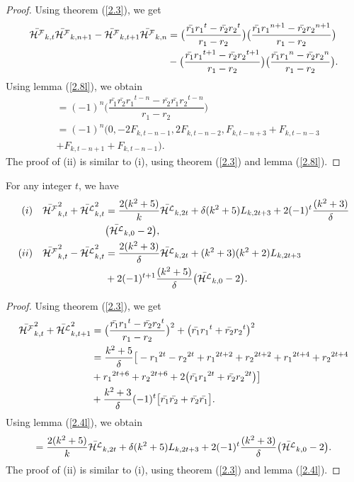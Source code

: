 \begin{proof}
Using theorem (\ref{2.3}), we get
\begin{align*}
\bar{{\mathcal{H^F}}}_{k,t}\bar{{\mathcal{H^F}}}_{k,n+1}-\bar{{\mathcal{H^F}}}_{k,t+1}\bar{{\mathcal{H^F}}}_{k,n}&=\big(\dfrac{\bar{r_1}{{r_1}}^{t}-\bar{r_2}{r_{2}}^{t}}{r_1-r_2}\big)\big(\dfrac{\bar{r_1}{{r_1}}^{n+1}-\bar{r_2}{r_{2}}^{n+1}}{r_1-r_2}\big)\\&-\big(\dfrac{\bar{r_1}{{r_1}}^{t+1}-\bar{r_2}{r_{2}}^{t+1}}{r_1-r_2}\big)\big(\dfrac{\bar{r_1}{{r_1}}^{n}-\bar{r_2}{r_{2}}^{n}}{r_1-r_2}\big).
\end{align*}
Using lemma (\ref{2.8l}), we obtain
\begin{align*}
&=(-1)^{n}\big(\dfrac{\bar{r_1}\bar{r_2}{{r_1}}^{t-n}-\bar{r_2}\bar{r_1}{r_{2}}^{t-n}}{r_1-r_2}\big)\\
&=(-1)^n \big(0, -2F_{k,t-n-1},2F_{k,t-n-2}, F_{k,t-n+3}+F_{k,t-n-3}\\&+F_{k,t-n+1}+F_{k,t-n-1}\big).
\end{align*}
The proof of (ii) is similar to (i), using theorem (\ref{2.3}) and lemma (\ref{2.8l}).
\end{proof}
\begin{theorem} For any integer $t$, we have\label{2.12t}
\begin{align*}
(i)\quad{\bar{{\mathcal{H^F}}}_{k,t}}^2+{\bar{{\mathcal{H^L}}}_{k,t}}^2&=\dfrac{2(k^2+5)}{k}\bar{{\mathcal{H^L}}}_{k,2t}+\delta(k^2+5)L_{k,2t+3}+2(-1)^t\dfrac{(k^2+3)}{\delta}\\&\big(\bar{{\mathcal{H^L}}}_{k,0}-2\big),\\
(ii)\quad{\bar{{\mathcal{H^F}}}_{k,t}}^2-{\bar{{\mathcal{H^L}}}_{k,t}}^2&=\dfrac{2(k^2+3)}{\delta}\bar{{\mathcal{H^L}}}_{k,2t}+(k^2+3)(k^2+2)L_{k,2t+3}\\&+2(-1)^{t+1}\dfrac{(k^2+5)}{\delta}\big(\bar{{\mathcal{H^L}}}_{k,0}-2\big).
\end{align*}
\end{theorem}
\begin{proof}
Using theorem (\ref{2.3}), we get
\begin{align*}
{\bar{{\mathcal{H^F}}}_{k,t}}^2+{\bar{{\mathcal{H^L}}}_{k,t+1}}^2&=\big(\dfrac{\bar{r_1}{{r_1}}^{t}-\bar{r_2}{r_{2}}^{t}}{r_1-r_2}\big)^2+\big(\bar{r_1}{{r_1}}^{t}+\bar{r_2}{r_{2}}^{t}\big)^2\\
&=\dfrac{k^2+5}{\delta}\big[-{r_1}^{2t}-{r_2}^{2t}+{r_1}^{2t+2}+{r_2}^{2t+2}+{r_1}^{2t+4}+{r_2}^{2t+4}\\&+{r_1}^{2t+6}+{r_2}^{2t+6}+2\big(\bar{r_1}{r_1}^{2t}+\bar{r_2}{r_2}^{2t}\big)\big]\\&+\dfrac{k^2+3}{\delta}(-1)^t\big[\bar{r_1}\bar{r_2}+\bar{r_2}\bar{r_1}\big].
\end{align*}
Using lemma (\ref{2.4l}), we obtain
\begin{align*}
=\dfrac{2(k^2+5)}{k}\bar{{\mathcal{H^L}}}_{k,2t}+\delta(k^2+5)L_{k,2t+3}+2(-1)^t\dfrac{(k^2+3)}{\delta}\big(\bar{{\mathcal{H^L}}}_{k,0}-2\big).
\end{align*}
The proof of (ii) is similar to (i), using theorem (\ref{2.3}) and lemma (\ref{2.4l}).
\end{proof}
